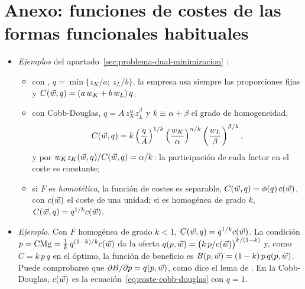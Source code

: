 \documentclass[11pt]{article}
\begin{document}
\section{Anexo: funciones de costes\cortetitulo{} de las formas funcionales habituales}\label{anexo:formas-costes}

\begin{itemize}
\item \emph{Ejemplos} del apartado~\ref{sec:problema-dual-minimizacion} :
  \begin{itemize}
  \item con , $q=\min\{z_K/a;\,z_L/b\}$, la empresa usa siempre las proporciones fijas y $C(\vec{w},q)=(a\,w_K+b\,w_L)\,q$;
  \item con Cobb-Douglas, $q=A\,z_K^{\alpha}z_L^{\beta}$ y $k\equiv\alpha+\beta$ el grado de homogeneidad,
    \begin{equation}
    C(\vec{w},q)=k\left(\frac{q}{A}\right)^{1/k}\left(\frac{w_K}{\alpha}\right)^{\alpha/k}\left(\frac{w_L}{\beta}\right)^{\beta/k}, \label{eq:coste-cobb-douglas}
    \end{equation}
    y por  $w_Kz_K(\vec{w},q)/C(\vec{w},q)=\alpha/k$: la participación de cada factor en el coste es constante;
  \item si $F$ es \emph{homotética}, la función de costes es separable, $C(\vec{w},q)=\phi(q)\,c(\vec{w})$, con $c(\vec{w})$ el coste de una unidad; si es homogénea de grado $k$, $C(\vec{w},q)=q^{1/k}c(\vec{w})$\nocite{Varian1992Microeconomic}.
  \end{itemize}
\item \emph{Ejemplo}. Con $F$ homogénea de grado $k<1$, $C(\vec{w},q)=q^{1/k}c(\vec{w})$. La condición $p=\mathrm{CMg}=\tfrac{1}{k}\,q^{(1-k)/k}c(\vec{w})$ da la oferta $q(p,\vec{w})=\big(k\,p/c(\vec{w})\big)^{k/(1-k)}$ y, como $C=k\,p\,q$ en el óptimo, la función de beneficio es $B(p,\vec{w})=(1-k)\,p\,q(p,\vec{w})$. Puede comprobarse que $\partial B/\partial p=q(p,\vec{w})$, como dice el lema de . En la Cobb-Douglas, $c(\vec{w})$ es la ecuación~\eqref{eq:coste-cobb-douglas} con $q=1$.
\end{itemize}
\end{document}
